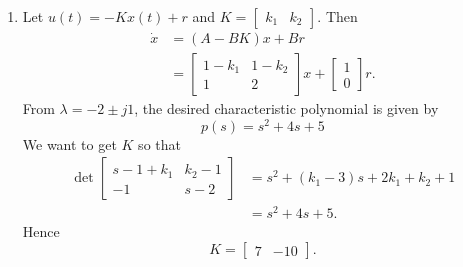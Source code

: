 \documentclass{article}
\begin{document}
\begin{enumerate}
    \item
    Let $u(t)=-Kx(t)+r$ and $K=\left[ \begin{matrix}
    k_1 & k_2
    \end{matrix} \right]$. Then 
    \begin{align}
    \dot{x}&=(A-BK)x+Br \\
    &= \left[ \begin{matrix}
    1-k_1 & 1-k_2 \\
    1 & 2
    \end{matrix} \right] x+
    \left[ \begin{matrix}
    1 \\
    0
    \end{matrix} \right] r.
    \end{align}
    From $\lambda=-2 \pm j1$, the desired characteristic polynomial is given by
    $$ p(s)=s^2+4s+5 $$
    We want to get $K$ so that
    \begin{align}
    \det \left[ \begin{matrix}
    s-1+k_1 & k_2-1 \\
    -1 & s-2
    \end{matrix} \right]
    &=s^2+(k_1-3)s+2k_1+k_2+1 \\
    &=s^2+4s+5.
    \end{align}
    Hence
    $$ K= \left[ \begin{matrix}
    7 & -10
    \end{matrix} \right]. $$
    
    \end{enumerate}
    
\end{document}
